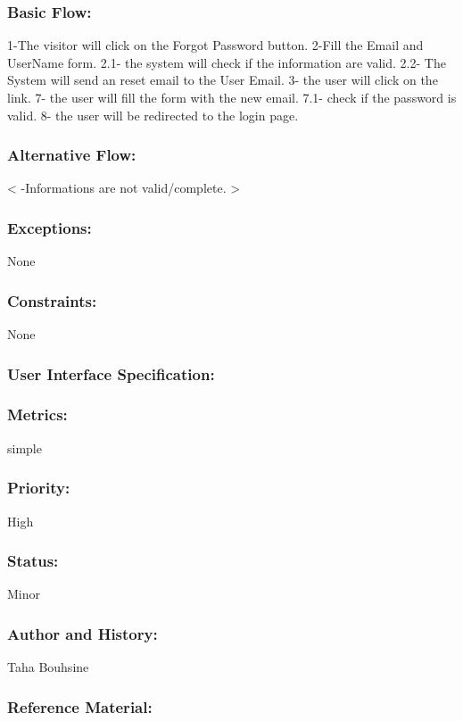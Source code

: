 \documentclass[11pt, openany]{report}
\begin{document}
\subsubsection{Basic Flow:}
1-The visitor will click on the Forgot Password button.
2-Fill the Email and UserName form.
  2.1- the system will check if the information are valid.
  2.2- The System will send an reset email to the User Email.
3- the user will click on the link.
7- the user will fill the form with the new email.
  7.1- check if the password is valid.
8- the user will be redirected to the login page.
\subsubsection{Alternative Flow:}
< -Informations are not valid/complete. >
\subsubsection{Exceptions:}
None
\subsubsection{Constraints:}
None
\subsubsection{User Interface Specification:}
\subsubsection{Metrics:}
simple
\subsubsection{Priority:}
High
\subsubsection{Status:}
Minor
\subsubsection{Author and History:}
Taha Bouhsine
\subsubsection{Reference Material:}
\end{document}

